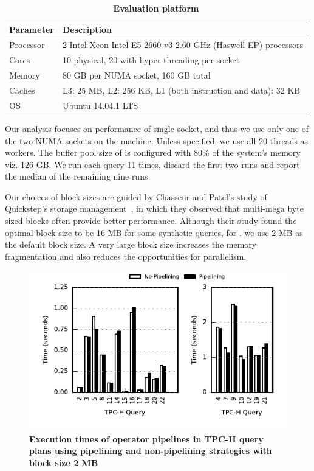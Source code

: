 \begin{table}[h]
	\centering
	\begin{tabular}{|l|l|}
		\hline
		\textbf{Parameter} & \textbf{Description} \\ \hline
		Processor & 2 Intel Xeon Intel E5-2660 v3 2.60 GHz (Haswell EP) processors\\ \hline
		Cores & 10 physical, 20 with hyper-threading per socket \\ \hline
		Memory & 80 GB per NUMA socket, 160 GB total \\ \hline
		Caches & L3: 25 MB, L2: 256 KB, L1 (both instruction and data): 32 KB \\ \hline
		OS & Ubuntu 14.04.1 LTS \\ \hline
	\end{tabular}
	\caption{\textbf{Evaluation platform}}
	\label{table:hardware-pipelining}
\end{table}

Our analysis focuses on performance of single socket, and thus we use only one of the two NUMA sockets on the machine.
Unless specified, we use all 20 threads as \sys{} workers.
The buffer pool size of \sys{} is configured with 80\% of the system's memory viz. 126 GB.
We run each query 11 times, discard the first two runs and report the median of the remaining nine runs. 

Our choices of block sizes are guided by Chasseur and Patel's study of Quickstep's storage management~\cite{quickstep-storage}, in which they observed that multi-mega byte sized blocks often provide better performance. 
Although their study found the optimal block size to be 16 MB for some synthetic queries, for \sys{}. we use 2 MB as the default block size. 
A very large block size increases the memory fragmentation and also reduces the opportunities for parallelism. 

\begin{figure}[ht]
	\centering 
	\includegraphics{pipeline/figures/deep-pipeline-comparison-2mb-withlip}
	\caption{\textbf{Execution times of operator pipelines in TPC-H query plans using pipelining and non-pipelining strategies with block size 2 MB}}
	\label{fig:deep-pipeline-comparison-2mb}
\end{figure}

